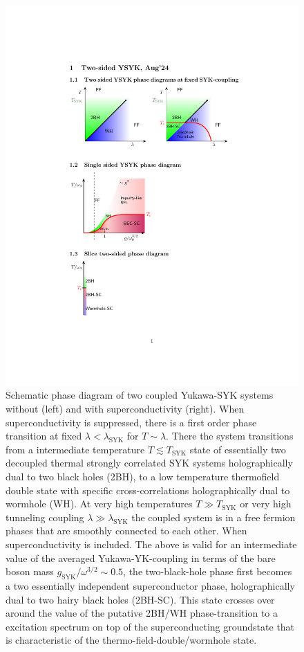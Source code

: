 \begin{figure}[t]
    \centering
    \includegraphics[width=0.9\linewidth]{figures/chapter3/2YSYK-PhaseDiagram-v3.pdf}
    \caption{
        Schematic phase diagram of two coupled Yukawa-SYK systems without (left) and with superconductivity (right). When superconductivity is suppressed, there is a first order phase transition at fixed $\lambda < \lambda_{\text{SYK}}$ for $T\sim \lambda$. There the system transitions from a intermediate temperature $T\lesssim T_{\text{SYK}}$ state of essentially two decoupled thermal strongly correlated SYK systems holographically dual to two black holes (2BH), to a low temperature thermofield double state with specific cross-correlations holographically dual to wormhole (WH).  At very high temperatures $T \gg T_{\text{SYK}}$ or very high tunneling coupling $\lambda\gg\lambda_{\text{SYK}}$ the coupled system is in a free fermion phases that are smoothly connected to each other. When superconductivity is included. The above is valid for an intermediate value of the averaged Yukawa-YK-coupling in terms of the bare boson mass $g_{\text{SYK}}/\omega^{3/2}\sim 0.5$, the two-black-hole phase first becomes a two essentially independent superconductor phase, holographically dual to two hairy black holes (2BH-SC). This state crosses over around the value of the putative 2BH/WH phase-transition to a excitation spectrum on top of the superconducting groundstate that is characteristic of the thermo-field-double/wormhole state.  %
}
\end{figure}
